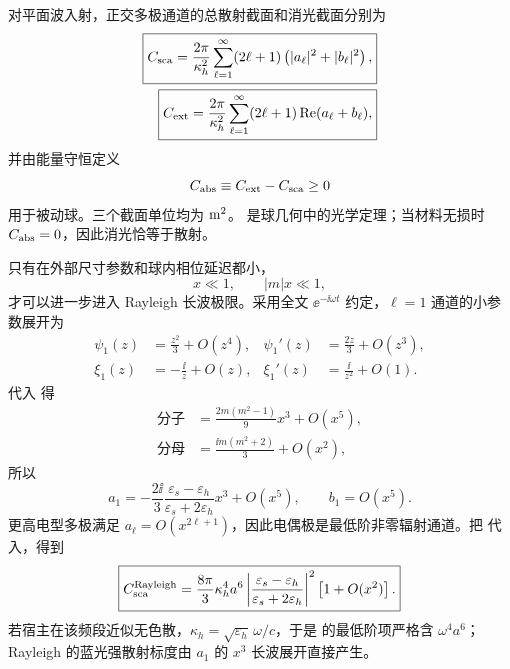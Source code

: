 \begin{exbox}
对平面波入射，正交多极通道的总散射截面和消光截面分别为
\begin{align}
 \boxed{
 C_{\rm sca}
 =\frac{2\pi}{\kappa_h^2}
 \sum_{\ell=1}^{\infty}(2\ell+1)
 \left(|a_\ell|^2+|b_\ell|^2\right),}
 \label{eq:mie-scattering-cross-section-dp75}\\
 \boxed{
 C_{\rm ext}
 =\frac{2\pi}{\kappa_h^2}
 \sum_{\ell=1}^{\infty}(2\ell+1)
 \operatorname{Re}(a_\ell+b_\ell),}
 \label{eq:mie-extinction-cross-section-dp75}
\end{align}
并由能量守恒定义
\begin{equation*}
C_{\rm abs}\equiv C_{\rm ext}-C_{\rm sca}\ge0
\end{equation*}
用于被动球。三个截面单位均为 ${\rm m^2}$。 是球几何中的光学定理；当材料无损时 $C_{\rm abs}=0$，因此消光恰等于散射。

只有在外部尺寸参数和球内相位延迟都小，
\begin{equation}
\boxed{x\ll1,\qquad |m|x\ll1,}
\label{eq:rayleigh-control-dp75}
\end{equation}
才可以进一步进入 Rayleigh 长波极限。采用全文 $\ee^{-\ii\omega t}$ 约定，$\ell=1$ 通道的小参数展开为
\begin{align*}
\psi_1(z)&=\frac{z^2}{3}+O(z^4),
&\psi_1'(z)&=\frac{2z}{3}+O(z^3),\\
\xi_1(z)&=-\frac{\ii}{z}+O(z),
&\xi_1'(z)&=\frac{\ii}{z^2}+O(1).
\end{align*}
代入 得
\begin{align*}
\text{分子}
&=\frac{2m(m^2-1)}{9}x^3+O(x^5),\\
\text{分母}
&=\frac{\ii m(m^2+2)}{3}+O(x^2),
\end{align*}
所以
\begin{equation}
\boxed{
 a_1
 =-\frac{2\ii}{3}
 \frac{\varepsilon_s-\varepsilon_h}
 {\varepsilon_s+2\varepsilon_h}
 x^3+O(x^5),
 \qquad
 b_1=O(x^5).}
\label{eq:rayleigh-mie-a1-dp75}
\end{equation}
更高电型多极满足 $a_\ell=O(x^{2\ell+1})$，因此电偶极是最低阶非零辐射通道。把 代入，得到
\begin{equation}
\boxed{
 C_{\rm sca}^{\rm Rayleigh}
 =\frac{8\pi}{3}\kappa_h^4a^6
 \left|
 \frac{\varepsilon_s-\varepsilon_h}
 {\varepsilon_s+2\varepsilon_h}
 \right|^2
 \left[1+O(x^2)\right].}
\label{eq:rayleigh-scattering-cross-section-dp75}
\end{equation}
若宿主在该频段近似无色散，$\kappa_h=\sqrt{\varepsilon_h}\,\omega/c$，于是 的最低阶项严格含 $\omega^4a^6$；Rayleigh 的蓝光强散射标度由 $a_1$ 的 $x^3$ 长波展开直接产生。


\end{exbox}
